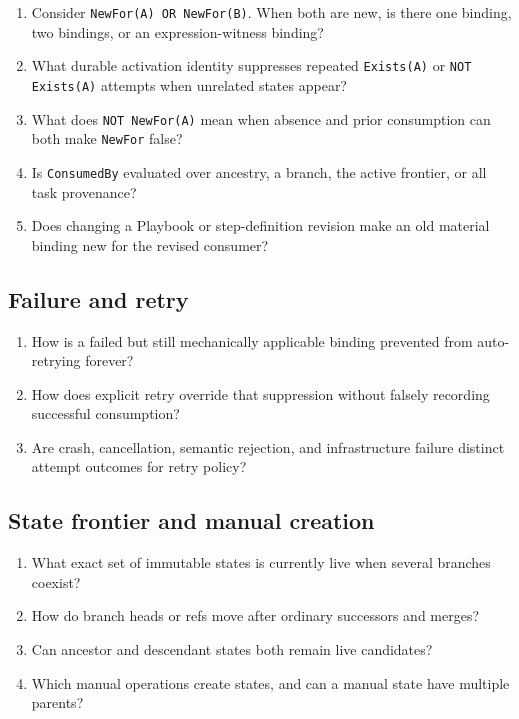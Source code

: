 \documentclass[11pt]{article}
\newcommand{\artifact}[1]{\texttt{#1}}
\begin{document}
\begin{enumerate}
  \item Consider \texttt{NewFor(A) OR NewFor(B)}. When both are new, is there one binding, two bindings, or an expression-witness binding?
  \item What durable activation identity suppresses repeated \texttt{Exists(A)} or \texttt{NOT Exists(A)} attempts when unrelated states appear?
  \item What does \texttt{NOT NewFor(A)} mean when absence and prior consumption can both make \artifact{NewFor} false?
  \item Is \artifact{ConsumedBy} evaluated over ancestry, a branch, the active frontier, or all task provenance?
  \item Does changing a Playbook or step-definition revision make an old material binding new for the revised consumer?
\end{enumerate}

\subsection{Failure and retry}

\begin{enumerate}
  \item How is a failed but still mechanically applicable binding prevented from auto-retrying forever?
  \item How does explicit retry override that suppression without falsely recording successful consumption?
  \item Are crash, cancellation, semantic rejection, and infrastructure failure distinct attempt outcomes for retry policy?
\end{enumerate}

\subsection{State frontier and manual creation}

\begin{enumerate}
  \item What exact set of immutable states is currently live when several branches coexist?
  \item How do branch heads or refs move after ordinary successors and merges?
  \item Can ancestor and descendant states both remain live candidates?
  \item Which manual operations create states, and can a manual state have multiple parents?
\end{enumerate}
\end{document}
